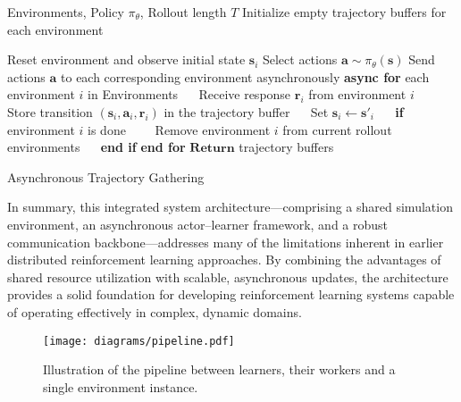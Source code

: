 \documentclass[11pt]{article}
\begin{document}
%
%
%
%
%
%

    \begin{algorithm}
        \begin{algorithmic}[1]
            \Require Environments, Policy $\pi_{\theta}$, Rollout length $T$
            \State Initialize empty trajectory buffers for each environment

                \State Reset environment and observe initial state $\mathbf{s}_i$
            \EndFor
                \State Select actions $\mathbf{a} \sim \pi_{\theta}(\mathbf{s})$
                \State Send actions $\mathbf{a}$ to each corresponding environment asynchronously
                \State \textbf{async for} {each environment $i$ in Environments}
                    \State $\quad$ Receive response $\mathbf{r}_i$ from environment $i$
                    \State $\quad$ Store transition $(\mathbf{s}_i, \mathbf{a}_i, \mathbf{r}_i)$ in the trajectory buffer
                    \State $\quad$ Set $\mathbf{s}_i \leftarrow \mathbf{s'}_i$
                    \State $\quad$ \textbf{if} environment $i$ is done
                        \State $\quad$$\quad$Remove environment $i$ from current rollout environments
                    \State $\quad$ \textbf{end if}
                \State \textbf{end for}
            \EndFor
            \State $\textbf{Return}$ trajectory buffers
        \end{algorithmic}
        \caption{Asynchronous Trajectory Gathering}
        \label{alg:trajectory}
    \end{algorithm}

    In summary, this integrated system architecture—comprising a shared simulation environment, an asynchronous actor–learner framework, and
    a robust communication backbone—addresses many of the limitations inherent in earlier distributed reinforcement learning approaches.
    By combining the advantages of shared resource utilization with scalable, asynchronous updates, the architecture provides a solid foundation for
    developing reinforcement learning systems capable of operating effectively in complex, dynamic domains.

    \begin{figure}
        \centering
        \texttt{[image: diagrams/pipeline.pdf]}
        \caption{Illustration of the pipeline between learners, their workers and a single environment instance.}
        \label{fig:lob_simulation}
    \end{figure}
\end{document}
